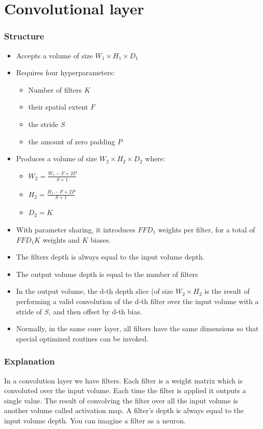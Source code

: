 \chapter{Convolutional layer}

\subsection*{Structure}

\begin{itemize}
\item Accepts a volume of size $W_1 \times H_1\times D_1$
\item Requires four hyperparameters:
\begin{itemize}
    \item Number of filters $K$
    \item their spatial extent $F$
    \item the stride $S$
    \item the amount of zero padding $P$
\end{itemize}
\item Produces a volume of size  $W_2 \times H_2 \times D_2$  where:
\begin{itemize}
    \item $W_2 = \frac{W_1-F+2P}{S+1}$
    \item $H_2 = \frac{H_1-F+2P}{S+1}$
    \item $D_2 = K$
\end{itemize}
\item With parameter sharing, it introduces $FFD_1$ weights per filter, for a total of $FFD_1K$ weights and $K$ biases.
\item The filters depth is always equal to the input volume depth.
\item The output volume depth is equal to the number of filters
\item In the output volume, the d-th depth slice (of size $W_2 \times H_2$ is the result of performing a valid convolution of the d-th filter over the input volume with a stride of $S$, and then offset by d-th bias.
\item Normally, in the same conv layer, all filters have the same dimensions so that special optimized routines can be invoked.
\end{itemize}

\subsection*{Explanation}
In a convolution layer we have filters. Each filter is a weight matrix which is convoluted over the input volume. Each time the filter is applied it outputs a single value. The result of convolving the filter over all the input volume is another volume called activation map. A filter's depth is always equal to the input volume depth. You can imagine a filter as a neuron.

